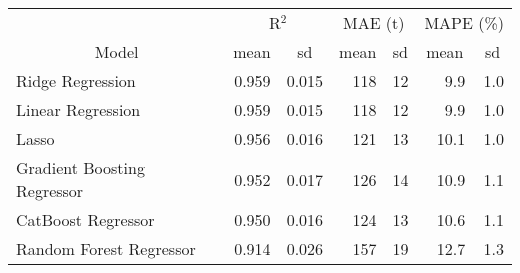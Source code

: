 
\begin{tabular}[t]{lrrrrrr}
\toprule
\multicolumn{1}{c}{ } & \multicolumn{2}{c}{R$^2$} & \multicolumn{2}{c}{MAE (t)} & \multicolumn{2}{c}{MAPE (\%)} \\
\cmidrule(l{3pt}r{3pt}){2-3} \cmidrule(l{3pt}r{3pt}){4-5} \cmidrule(l{3pt}r{3pt}){6-7}
\multicolumn{1}{c}{Model} & \multicolumn{1}{c}{mean} & \multicolumn{1}{c}{sd} & \multicolumn{1}{c}{mean} & \multicolumn{1}{c}{sd} & \multicolumn{1}{c}{mean} & \multicolumn{1}{c}{sd}\\
\midrule
Ridge Regression & 0.959 & 0.015 & 118 & 12 & 9.9 & 1.0\\
Linear Regression & 0.959 & 0.015 & 118 & 12 & 9.9 & 1.0\\
Lasso & 0.956 & 0.016 & 121 & 13 & 10.1 & 1.0\\
Gradient Boosting Regressor & 0.952 & 0.017 & 126 & 14 & 10.9 & 1.1\\
CatBoost Regressor & 0.950 & 0.016 & 124 & 13 & 10.6 & 1.1\\
Random Forest Regressor & 0.914 & 0.026 & 157 & 19 & 12.7 & 1.3\\
\bottomrule
\end{tabular}
